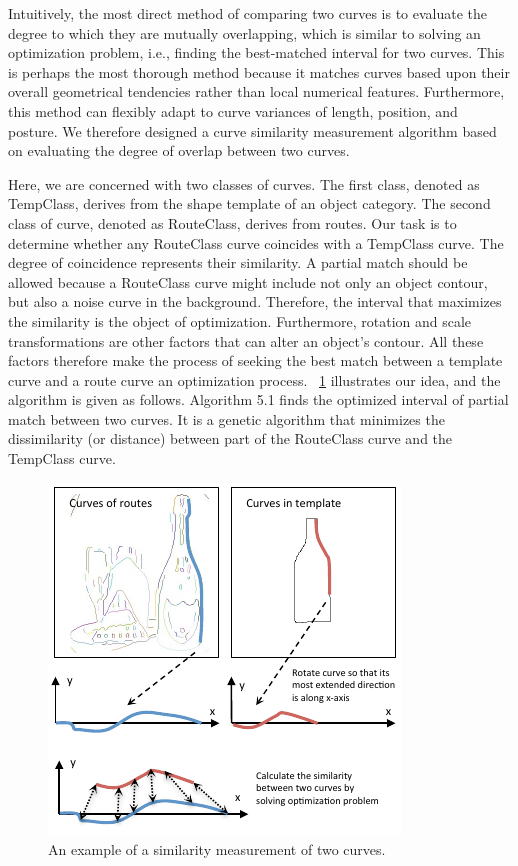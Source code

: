 \documentclass[journal]{IEEEtran}
\begin{document}
Intuitively, the most direct method of comparing two curves is to evaluate the degree to which they are mutually overlapping, 
which is similar to solving an optimization problem, i.e., 
finding the best-matched interval for two curves. 
This is perhaps the most thorough method because it matches curves based upon their overall geometrical tendencies rather than local numerical features. 
Furthermore, this method can flexibly adapt to curve variances of length, position, and posture. 
We therefore designed a curve similarity measurement algorithm based on evaluating the degree of overlap between two curves. 

Here, we are concerned with two classes of curves. 
The first class, denoted as TempClass, derives from the shape template of an object category. 
The second class of curve, denoted as RouteClass, derives from routes. 
Our task is to determine whether any RouteClass curve coincides with a TempClass curve. 
The degree of coincidence represents their similarity. 
A partial match should be allowed because a RouteClass curve might include not only an object contour, 
but also a noise curve in the background. 
Therefore, the interval that maximizes the similarity is the object of optimization. 
Furthermore, rotation and scale transformations are other factors that can alter an object's contour. 
All these factors therefore make the process of seeking the best match between a template curve and a route curve an optimization process. 
\figurename~\ref{fig:12} illustrates our idea, and the algorithm is given as follows.
Algorithm 5.1 finds the optimized interval of partial match between two curves.
It is a genetic algorithm that minimizes the dissimilarity (or distance) 
between part of the RouteClass curve and the TempClass curve.

\begin{figure}[!t]
\centering
\includegraphics[width=0.8\linewidth]{images/fig12.pdf}
\caption{An example of a similarity measurement of two curves.}
\label{fig:12}
\end{figure}
\end{document}
